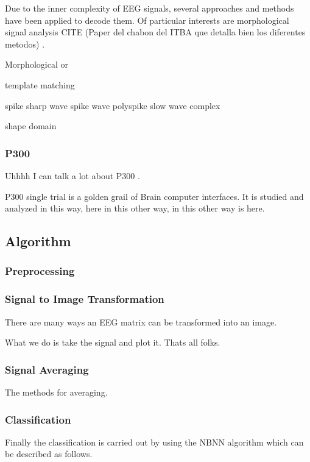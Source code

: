 \documentclass[entropy,article,submit,moreauthors,pdftex,10pt,a4paper]{mdpi}
\begin{document}
Due to the inner complexity of EEG signals, several approaches and methods have been applied to decode them.  Of particular interests are morphological signal analysis 
CITE (Paper del chabon del ITBA que detalla bien los diferentes metodos) \citep{Alvarado-Gonzalez2016}.

Morphological or 

template matching

spike
sharp wave
spike wave
polyspike 
slow wave complex

shape domain

\subsubsection{P300}

Uhhhh I can talk a lot about P300 \citep{Knuth2006}.

P300 single trial is a golden grail of Brain computer interfaces.  It is studied and analyzed in this way, here in this other way, in this other way is here.

\subsection{Algorithm}

\subsubsection{Preprocessing}

\subsubsection{Signal to Image Transformation}

There are many ways an EEG matrix can be transformed into an image.

What we do is take the signal and plot it.  Thats all folks.

\subsubsection{Signal Averaging}

The methods for averaging.

\subsubsection{Classification}

Finally the classification is carried out by using the NBNN algorithm which can be described as follows.
\end{document}
